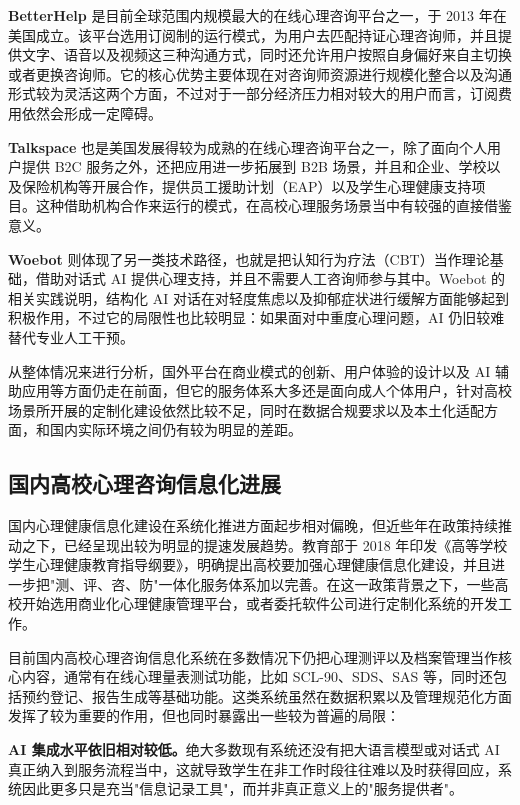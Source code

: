 \textbf{BetterHelp} 是目前全球范围内规模最大的在线心理咨询平台之一，于 2013 年在美国成立。该平台选用订阅制的运行模式，为用户去匹配持证心理咨询师，并且提供文字、语音以及视频这三种沟通方式，同时还允许用户按照自身偏好来自主切换或者更换咨询师。它的核心优势主要体现在对咨询师资源进行规模化整合以及沟通形式较为灵活这两个方面，不过对于一部分经济压力相对较大的用户而言，订阅费用依然会形成一定障碍\cite{baumel2019}。

\textbf{Talkspace} 也是美国发展得较为成熟的在线心理咨询平台之一，除了面向个人用户提供 B2C 服务之外，还把应用进一步拓展到 B2B 场景，并且和企业、学校以及保险机构等开展合作，提供员工援助计划（EAP）以及学生心理健康支持项目\cite{mohr2018}。这种借助机构合作来运行的模式，在高校心理服务场景当中有较强的直接借鉴意义。

\textbf{Woebot} 则体现了另一类技术路径，也就是把认知行为疗法（CBT）当作理论基础，借助对话式 AI 提供心理支持，并且不需要人工咨询师参与其中\cite{fitzpatrick2017}。Woebot 的相关实践说明，结构化 AI 对话在对轻度焦虑以及抑郁症状进行缓解方面能够起到积极作用，不过它的局限性也比较明显：如果面对中重度心理问题，AI 仍旧较难替代专业人工干预。

从整体情况来进行分析，国外平台在商业模式的创新、用户体验的设计以及 AI 辅助应用等方面仍走在前面，但它的服务体系大多还是面向成人个体用户，针对高校场景所开展的定制化建设依然比较不足，同时在数据合规要求以及本土化适配方面，和国内实际环境之间仍有较为明显的差距。

\subsection{国内高校心理咨询信息化进展}

国内心理健康信息化建设在系统化推进方面起步相对偏晚，但近些年在政策持续推动之下，已经呈现出较为明显的提速发展趋势。教育部于 2018 年印发《高等学校学生心理健康教育指导纲要》，明确提出高校要加强心理健康信息化建设，并且进一步把"测、评、咨、防"一体化服务体系加以完善\cite{moe2018}。在这一政策背景之下，一些高校开始选用商业化心理健康管理平台，或者委托软件公司进行定制化系统的开发工作。

目前国内高校心理咨询信息化系统在多数情况下仍把心理测评以及档案管理当作核心内容，通常有在线心理量表测试功能，比如 SCL-90、SDS、SAS 等，同时还包括预约登记、报告生成等基础功能\cite{chen2020}。这类系统虽然在数据积累以及管理规范化方面发挥了较为重要的作用，但也同时暴露出一些较为普遍的局限：

\textbf{AI 集成水平依旧相对较低。}绝大多数现有系统还没有把大语言模型或对话式 AI 真正纳入到服务流程当中，这就导致学生在非工作时段往往难以及时获得回应，系统因此更多只是充当"信息记录工具"，而并非真正意义上的"服务提供者"。

